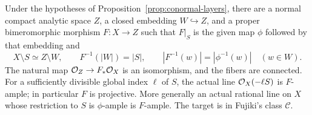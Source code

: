 \begin{proposition}\label{prop:prime-floor-extension}
Under the hypotheses of Proposition~\ref{prop:conormal-layers}, there
are a normal compact analytic space \(Z\), a closed embedding
\(W\hookrightarrow Z\), and a proper bimeromorphic morphism
\(F:X\to Z\) such that \(F|_S\) is the given map \(\phi\) followed
by that embedding and
\begin{equation}\label{eq:extension-fibers}
 X\setminus S\simeq Z\setminus W,\qquad
 F^{-1}(|W|)=|S|,\qquad
 |F^{-1}(w)|=|\phi^{-1}(w)|\quad(w\in W).
\end{equation}
The natural map \(\mathcal O_Z\to F_*\mathcal O_X\) is an isomorphism, and the
fibers are connected.  For a sufficiently divisible global index
\(\ell\) of \(S\), the actual line \(\mathcal O_X(-\ell S)\) is
\(F\)-ample; in particular \(F\) is projective.  More generally an
actual rational line on \(X\) whose restriction to \(S\) is
\(\phi\)-ample is \(F\)-ample.  The target is in Fujiki's class
\(\mathcal C\).
\end{proposition}
